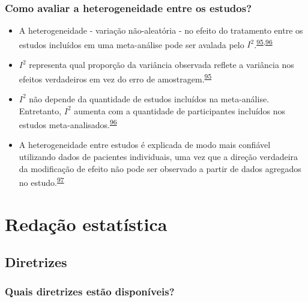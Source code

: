 \documentclass[
]{book}
\begin{document}
\hypertarget{como-avaliar-a-heterogeneidade-entre-os-estudos}{%
\subsection{Como avaliar a heterogeneidade entre os estudos?}\label{como-avaliar-a-heterogeneidade-entre-os-estudos}}

\begin{itemize}
\item
  A heterogeneidade - variação não-aleatória - no efeito do tratamento entre os estudos incluídos em uma meta-análise pode ser avalada pelo \(I^{2}\).\textsuperscript{\protect\hyperlink{ref-Borenstein2022}{95},\protect\hyperlink{ref-Ruxfccker2008}{96}}
\item
  \(I^{2}\) representa qual proporção da variância observada reflete a variância nos efeitos verdadeiros em vez do erro de amostragem.\textsuperscript{\protect\hyperlink{ref-Borenstein2022}{95}}
\item
  \(I^{2}\) não depende da quantidade de estudos incluídos na meta-análise. Entretanto, \(I^{2}\) aumenta com a quantidade de participantes incluídos nos estudos meta-analisados.\textsuperscript{\protect\hyperlink{ref-Ruxfccker2008}{96}}
\item
  A heterogeneidade entre estudos é explicada de modo mais confiável utilizando dados de pacientes individuais, uma vez que a direção verdadeira da modificação de efeito não pode ser observado a partir de dados agregados no estudo.\textsuperscript{\protect\hyperlink{ref-degrooth2023}{97}}
\end{itemize}

\hypertarget{redacao}{%
\chapter{\texorpdfstring{\textbf{Redação estatística}}{Redação estatística}}\label{redacao}}

\hypertarget{diretrizes}{%
\section{Diretrizes}\label{diretrizes}}

\hypertarget{quais-diretrizes-estuxe3o-disponuxedveis}{%
\subsection{Quais diretrizes estão disponíveis?}\label{quais-diretrizes-estuxe3o-disponuxedveis}}
\end{document}
